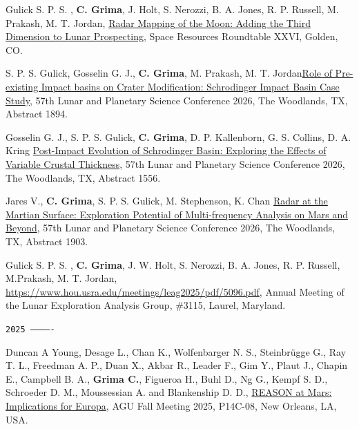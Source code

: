 \begin{etaremune}
\item
     Gulick S. P. S. , \textbf{C. Grima},  J. Holt, S. Nerozzi, B. A. Jones, R. P. Russell, M. Prakash, M. T. Jordan, \href{https://isruinfo.com/public/index.php?page=srr_26#SRR_26_1}{Radar Mapping of the Moon: Adding the Third Dimension to Lunar Prospecting}, Space Resources Roundtable XXVI, Golden, CO.

\item
     S. P. S. Gulick, Gosselin G. J., \textbf{C. Grima},  M. Prakash, M. T. Jordan\href{https://www.hou.usra.edu/meetings/lpsc2026/pdf/1894.pdf}{Role of Pre-existing Impact basins on Crater Modification: Schrodinger Impact Basin Case Study}, 57th Lunar and Planetary Science Conference 2026, The Woodlands, TX, Abstract 1894.

\item
     Gosselin G. J., S. P. S. Gulick, \textbf{C. Grima},  D. P. Kallenborn, G. S. Collins, D. A. Kring \href{https://www.hou.usra.edu/meetings/lpsc2026/pdf/1156.pdf}{Post-Impact Evolution of Schrodinger Basin: Exploring the Effects of Variable Crustal Thickness}, 57th Lunar and Planetary Science Conference 2026, The Woodlands, TX, Abstract 1556.

\item
     Jares V., \textbf{C. Grima}, S. P. S. Gulick, M. Stephenson, K. Chan \href{https://www.hou.usra.edu/meetings/lpsc2026/pdf/1903.pdf}{Radar at the Martian Surface: Exploration Potential of Multi-frequency Analysis on Mars and Beyond}, 57th Lunar and Planetary Science Conference 2026, The Woodlands, TX, Abstract 1903.


\item
    Gulick S. P. S. , \textbf{C. Grima}, J. W. Holt, S. Nerozzi, B. A. Jones, R. P. Russell, M.Prakash, M. T. Jordan, \href{Radar Mapping on the Moon: Critical Role of Higher Frequencies for Geology and Ressources}{https://www.hou.usra.edu/meetings/leag2025/pdf/5096.pdf}, Annual Meeting of the Lunar Exploration Analysis Group, \#3115, Laurel, Maryland.

\hspace{-2em}\texttt{2025 -------------}

\item
    Duncan A Young, Desage L., Chan K., Wolfenbarger N. S., Steinbrügge G., Ray T. L., Freedman A. P., Duan X., Akbar R., Leader F., Gim Y., Plaut J., Chapin E., Campbell B. A., \textbf{Grima C.}, Figueroa H., Buhl D., Ng G., Kempf S. D., Schroeder D. M., Moussessian A. and Blankenship D. D., \href{https://agu.confex.com/agu/agu25/meetingapp.cgi/Paper/1911187}{REASON at Mars: Implications for Europa}, AGU Fall Meeting 2025, P14C-08, New Orleans, LA, USA.


\end{etaremune}
